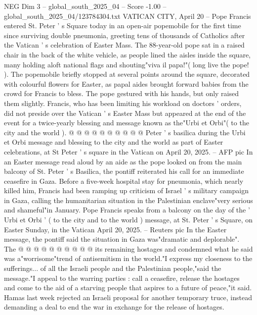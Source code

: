 \begin{textsample}{NEG Dim 3 – global\_south\_2025\_04 – Score -1.00 – global\_south\_2025\_04/123784304.txt}  \label{ex:f3_neg_340}
VATICAN CITY, April 20 -- Pope Francis entered St.
Peter ' s Square today in an open-air popemobile for the first time since surviving double pneumonia, greeting tens of thousands of Catholics after the Vatican ' s celebration of Easter Mass.
The 88-year-old pope sat in a raised chair in the back of the white vehicle, as people lined the aisles inside the square, many holding aloft national flags and shouting"viva il papa!"( long live the pope! ).
The popemobile briefly stopped at several points around the square, decorated with colourful flowers for Easter, as papal aides brought forward babies from the crowd for Francis to bless.
The pope gestured with his hands, but only raised them slightly.
Francis, who has been limiting his workload on doctors ' orders, did not preside over the Vatican ' s Easter Mass but appeared at the end of the event for a twice-yearly blessing and message known as the"Urbi et Orbi"( to the city and the world ). @ @ @ @ @ @ @ @ @ @ Peter ' s basilica during the Urbi et Orbi message and blessing to the city and the world as part of Easter celebrations, at St Peter ' s square in the Vatican on April 20, 2025. -- AFP pic In an Easter message read aloud by an aide as the pope looked on from the main balcony of St.
Peter ' s Basilica, the pontiff reiterated his call for an immediate ceasefire in Gaza.
Before a five-week hospital stay for pneumonia, which nearly killed him, Francis had been ramping up criticism of Israel ' s military campaign in Gaza, calling the humanitarian situation in the Palestinian enclave"very serious and shameful"in January.
Pope Francis speaks from a balcony on the day of the ' Urbi et Orbi ' ( to the city and to the world ) message, at St.
Peter ' s Square, on Easter Sunday, in the Vatican April 20, 2025. -- Reuters pic In the Easter message, the pontiff said the situation in Gaza was"dramatic and deplorable".
The @ @ @ @ @ @ @ @ @ @ its remaining hostages and condemned what he said was a"worrisome"trend of antisemitism in the world."I express my closeness to the sufferings... of all the Israeli people and the Palestinian people,"said the message."I appeal to the warring parties : call a ceasefire, release the hostages and come to the aid of a starving people that aspires to a future of peace,"it said.
Hamas last week rejected an Israeli proposal for another temporary truce, instead demanding a deal to end the war in exchange for the release of hostages.

\end{textsample}
